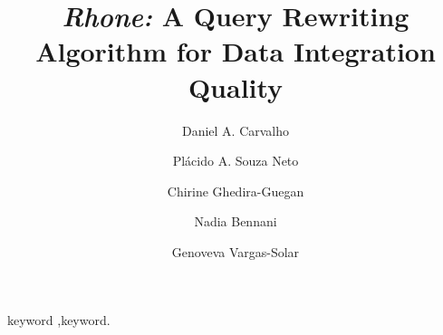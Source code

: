 \documentclass[preprint,12pt]{elsarticle}
\theoremstyle{plain}
\theoremstyle{plain}
\theoremstyle{plain}
\theoremstyle{plain}
\begin{document}
\begin{frontmatter}


\title{\textit{Rhone:} A Query Rewriting Algorithm for Data Integration Quality}


\author[inst1]{Daniel A. Carvalho}
 
\author[inst2]{Pl\'acido A. Souza Neto}
			 	 
\author[inst1]{Chirine Ghedira-Guegan}
\author[inst3]{Nadia Bennani}
\author[inst4]{Genoveva Vargas-Solar}

\address[inst2]{Instituto Federal do Rio Grande do Norte -- Natal, Brazil}
\address[inst4]{CNRS, LIG-LAFMIA, Saint Martin d'H\`eres, France}



\begin{abstract}


\end{abstract}

\begin{keyword}
keyword \sep keyword.

\end{keyword}


\end{frontmatter}


% 
 
% 
% 
% 
\end{document}
